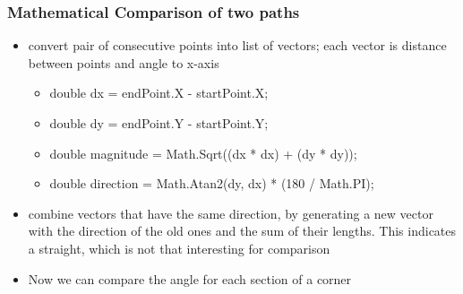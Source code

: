 \subsubsection{Mathematical Comparison of two paths}
\begin{itemize}
  \item convert pair of consecutive points into list of vectors; each vector is distance between points and angle to x-axis
  \begin{itemize}
    \item double dx = endPoint.X - startPoint.X;
    \item double dy = endPoint.Y - startPoint.Y;
    \item double magnitude = Math.Sqrt((dx * dx) + (dy * dy));
    \item double direction = Math.Atan2(dy, dx) * (180 / Math.PI);
  \end{itemize}
  \item combine vectors that have the same direction, by generating a new vector with the direction of the old ones and the sum of their lengths. This indicates a straight, which is not that interesting for comparison
  \item Now we can compare the angle for each section of a corner
\end{itemize}
\clearpage
